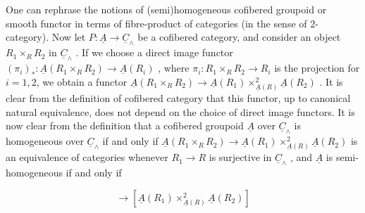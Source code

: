 \begin{center}
\end{center}
One can rephrase the notions of (semi)homogeneous cofibered groupoid or smooth functor in terms of fibre-product of categories (in the sense of 2-category). Now let  $P : \underline{A} \to \underline{C}_\wedge$  be a cofibered category, and consider an object $R_1 \times_R R_2$  in  $\underline{C}_\wedge$ . If we choose a direct image functor  $(\pi_i)_*: \underline{A}(R_1 \times_R R_2) \to \underline{A}(R_i)$ , where  $\pi_i : R_1 \times_R R_2 \to R_i$  is the projection for  $i = 1,2$,  we obtain a functor $\underline{A}(R_1 \times_R R_2) \to \underline{A}(R_1) \times^2_{\underline{A}(R)} \underline{A}(R_2)$ . It is clear from the definition of cofibered category that this functor, up to canonical natural equivalence, does not depend on the choice of direct image functors. It is now clear from the definition that a cofibered groupoid  $\underline{A}$  over  $\underline{C}_\wedge$  is homogeneous over  $\underline{C}_\wedge$  if and only if $\underline{A}(R_1 \times_R R_2) \to \underline{A}(R_1) \times^2_{\underline{A}(R)} \underline{A}(R_2)$  is an equivalence of categories whenever  $R_1 \to R$  is surjective in  $\underline{C}_\wedge$ , and  $\underline{A}$  is semi-homogeneous if and only if

\begin{equation*}
[\underline{A}(R_1 \times_R R_2)] \longrightarrow [\underline{A}(R_1) \times^2_{\underline{A}(R)} \underline{A}(R_2)] 
\end{equation*}

